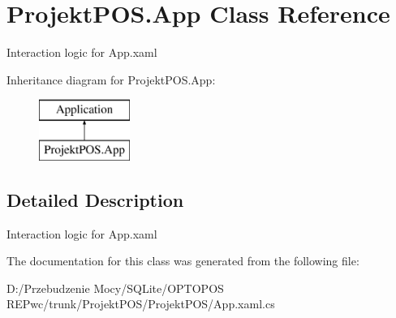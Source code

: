 \hypertarget{class_projekt_p_o_s_1_1_app}{}\section{Projekt\+P\+O\+S.\+App Class Reference}
\label{class_projekt_p_o_s_1_1_app}


Interaction logic for App.\+xaml  


Inheritance diagram for Projekt\+P\+O\+S.\+App\+:\begin{figure}[H]
\begin{center}
\leavevmode
\includegraphics[height=2.000000cm]{class_projekt_p_o_s_1_1_app}
\end{center}
\end{figure}


\subsection{Detailed Description}
Interaction logic for App.\+xaml 



The documentation for this class was generated from the following file\+:\begin{DoxyCompactItemize}
\item 
D\+:/\+Przebudzenie Mocy/\+S\+Q\+Lite/\+O\+P\+T\+O\+P\+O\+S R\+E\+Pwc/trunk/\+Projekt\+P\+O\+S/\+Projekt\+P\+O\+S/App.\+xaml.\+cs\end{DoxyCompactItemize}
